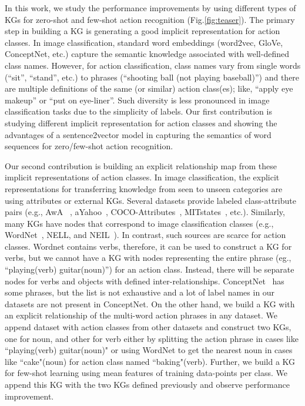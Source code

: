 In this work, we study the performance improvements by using different types of KGs for zero-shot and few-shot action recognition (Fig.\ref{fig:teaser}). The primary step in building a KG is generating a good implicit representation for action classes. In image classification, standard word embeddings (word2vec, GloVe, ConceptNet, etc.) capture the semantic knowledge associated with well-defined class names. However, for action classification, class names vary from single words (“sit”, “stand”, etc.) to phrases (“shooting ball (not playing baseball)”) and there are multiple definitions of the same (or similar) action class(es); like, “apply eye makeup” or “put on eye-liner”. Such diversity is less pronounced in image classification tasks due to the simplicity of labels. Our first contribution is studying different implicit representation for action classes and showing the advantages of a sentence2vector model in capturing the semantics of word sequences for zero/few-shot action recognition.

Our second contribution is building an explicit relationship map from these implicit representations of action classes. In image classification, the explicit representations for transferring knowledge from seen to unseen categories are using attributes or external KGs. Several datasets provide labeled class-attribute pairs (e.g., AwA~\cite{lampert2009learning} , aYahoo~\cite{farhadi2009describing}, COCO-Attributes~\cite{patterson2016coco}, MITstates~\cite{StatesAndTransformations}, etc.). Similarly, many KGs have nodes that correspond to image classification classes (e.g., WordNet~\cite{miller1995wordnet}, NELL, and NEIL~\cite{carlson2010toward,chen2013neil,wang2018zero}). In contrast, such sources are scarce for action classes. Wordnet contains verbs, therefore, it can be used to construct a KG for verbs, but we cannot have a KG with nodes representing the entire phrase (eg., ``playing(verb) guitar(noun)'') for an action class. Instead, there will be separate nodes for verbs and objects with defined inter-relationships. 
ConceptNet~\cite{conceptnet} has some phrases, but the list is not exhaustive and a lot of label names in our datasets are not present in ConceptNet.
On the other hand, we build a KG with an explicit relationship of the multi-word action phrases in any dataset. We append dataset with action classes from other datasets and construct two KGs, one for noun, and other for verb either by splitting the action phrase in cases like ``playing(verb) guitar(noun)" or using WordNet to get the nearest noun in cases like ``cake"(noun) for action class named ``baking"(verb). Further, we build a KG for few-shot learning using mean features of training data-points per class. We append this KG with the two KGs defined previously and observe performance improvement.


